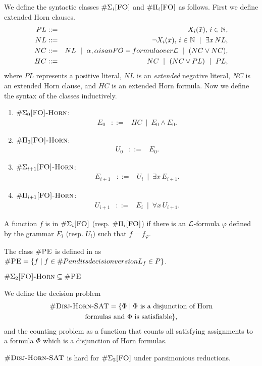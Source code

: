 We define the syntactic classes $\#\Sigma_{i}\textsc{[FO]}$ and $\#\Pi_{i}\textsc{[FO]}$ as follows. First we define extended Horn clauses.
\begin{eqnarray*}
	PL &::=& X_i(\x),\, i\in\N,\\
	NL &::=& \neg X_i(\x),\, i\in\N \ \mid \ \exists x\, NL,\\
	NC &::=& NL \ \mid \ \alpha, \alpha \mbox{ is an {\sc FO}-formula over } \L \ \mid \ (NC \vee NC),\\
	HC &::=& NC \ \mid \ (NC \vee PL) \ \mid \ PL,
\end{eqnarray*}
where $PL$ represents a positive literal, $NL$ is an \textit{extended} negative literal, $NC$ is an extended Horn clause, and $HC$ is an extended Horn formula. Now we define the syntax of the classes inductively.\textbf{}
\begin{enumerate}
	\item $\#\Sigma_{0}\textsc{[FO]-Horn}$:
	\begin{eqnarray*}
		E_0 &::=& HC \ \mid \ E_0 \wedge E_0.
	\end{eqnarray*}
	\item $\#\Pi_{0}\textsc{[FO]-Horn}$:
	\begin{eqnarray*}
		U_0 &::=& E_0.
	\end{eqnarray*}
	\item $\#\Sigma_{i+1}\textsc{[FO]-Horn}$:
	\begin{eqnarray*}
		E_{i+1} &::=& U_i \ \mid \ \exists x \, E_{i+1}.
	\end{eqnarray*}
	\item $\#\Pi_{i+1}\textsc{[FO]-Horn}$:
	\begin{eqnarray*}
		U_{i+1} &::=& E_i \ \mid \ \forall x \, U_{i+1}.
	\end{eqnarray*}
\end{enumerate}
A function $f$ is in $\#\Sigma_{i}\textsc{[FO]}$ (resp. $\#\Pi_{i}\textsc{[FO]}$) if there is an $\L$-formula $\varphi$ defined by the grammar $E_i$ (resp. $U_i$) such that $f = f_{\varphi}$.

The class $\text{\sc \#PE}$ is defined in \cite{DBLP:conf/mfcs/PagourtzisZ06} as $\text{\sc \#PE} = \{f\mid f\in\#P \relax{ and its decision version } L_{f}\in P\}$.

\begin{theorem} \label{sigma2-pe}
	$\#\Sigma_{2}\textsc{[FO]-Horn} \subseteq \text{\sc \#PE}$
\end{theorem}

We define the decision problem
\begin{multline*}
\textsc{\#Disj-Horn-SAT} = \{\Phi \mid \Phi \text{ is a disjunction of Horn} \\ \text{formulas and $\Phi$ is satisfiable}\},
\end{multline*}
and the counting problem {\shdhsat } as a function that counts all satisfying assignments to a formula $\Phi$ which is a disjunction of Horn formulas.

\begin{theorem} \label{sigma2hard}
	$\textsc{\#Disj-Horn-SAT}$ is hard for $\#\Sigma_{2}\textsc{[FO]}$ under parsimonious reductions. 
\end{theorem}
